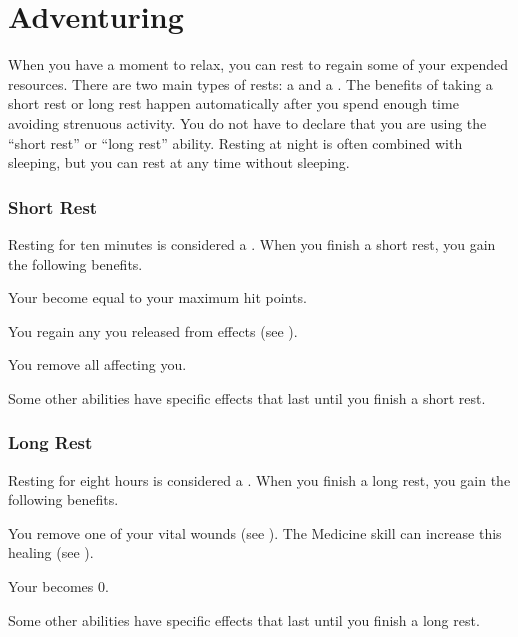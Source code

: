 \chapter{Adventuring}\label{Adventuring}


  When you have a moment to relax, you can rest to regain some of your expended resources.
  There are two main types of rests: a  and a .
  The benefits of taking a short rest or long rest happen automatically after you spend enough time avoiding strenuous activity.
  You do not have to declare that you are using the ``short rest'' or ``long rest'' ability.
  Resting at night is often combined with sleeping, but you can rest at any time without sleeping.


  \subsection{Short Rest}\label{Short Rest}
    Resting for ten minutes is considered a .
    When you finish a short rest, you gain the following benefits.
    \begin{raggeditemize}
      \item Your  become equal to your maximum hit points.
      \item You regain any  you released from  effects (see ).
      \item You remove all  affecting you.
      \item Some other abilities have specific effects that last until you finish a short rest.
    \end{raggeditemize}

  \subsection{Long Rest}\label{Long Rest}
    Resting for eight hours is considered a .
    When you finish a long rest, you gain the following benefits.
    \begin{raggeditemize}
      \item You remove one of your vital wounds (see ).
        The Medicine skill can increase this healing (see ).
      \item Your  becomes 0.
      \item Some other abilities have specific effects that last until you finish a long rest.
    \end{raggeditemize}

